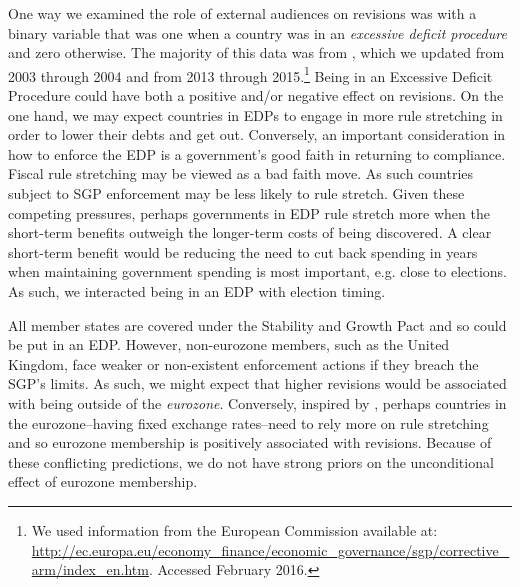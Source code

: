 \documentclass[]{article}
\begin{document}
One way we examined the role of external audiences on revisions was with a binary variable that was one when a country was in an \emph{excessive deficit procedure} and zero otherwise. The majority of this data was from \cite{baergHallerberg2016}, which we updated from 2003 through 2004 and from 2013 through 2015.\footnote{We used information from the European Commission available at: \url{http://ec.europa.eu/economy_finance/economic_governance/sgp/corrective_arm/index_en.htm}. Accessed February 2016.}  Being in an Excessive Deficit Procedure could have both a positive and/or negative effect on revisions. On the one hand, we may expect countries in EDPs to engage in more rule stretching in order to lower their debts and get out. Conversely, an important consideration in how to enforce the EDP is a government's good faith in returning to compliance. Fiscal rule stretching may be viewed as a bad faith move. As such countries subject to SGP enforcement may be less likely to rule stretch. Given these competing pressures, perhaps governments in EDP rule stretch more when the short-term benefits outweigh the longer-term costs of being discovered. A clear short-term benefit would be reducing the need to cut back spending in years when maintaining government spending is most important, e.g. close to elections. As such, we interacted being in an EDP with election timing.

All member states are covered under the Stability and Growth Pact and so could be put in an EDP. However, non-eurozone members, such as the United Kingdom, face weaker or non-existent enforcement actions if they breach the SGP's limits. As such, we might expect that higher revisions would be associated with being outside of the \emph{eurozone}. Conversely, inspired by \cite{clark2003}, perhaps countries in the eurozone--having fixed exchange rates--need to rely more on rule stretching and so eurozone membership is positively associated with revisions. Because of these conflicting predictions, we do not have strong priors on the unconditional effect of eurozone membership.
\end{document}
